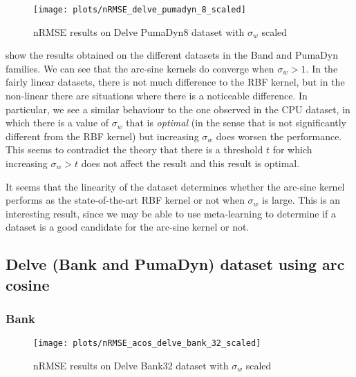 \begin{figure}[H]
    \texttt{[image: plots/nRMSE\_delve\_pumadyn\_8\_scaled]}
    \caption{nRMSE results on Delve PumaDyn8 dataset with $\sigma_w$ scaled}
    \label{fig:nrmse-delve-pumadyn-8-scaled}
\end{figure}

show the results obtained on the different datasets in the Band and PumaDyn
families. We can see that the arc-sine kernels do converge when $\sigma_w > 1$.
In the fairly linear datasets, there is not much difference to the RBF kernel,
but in the non-linear there are situations where there is a noticeable
difference. In particular, we see a similar behaviour to the one observed in the
CPU dataset, in which there is a value of $\sigma_w$ that is \emph{optimal} (in
the sense that is not significantly different from the RBF kernel) but
increasing $\sigma_w$ does worsen the performance. This seems to contradict the
theory that there is a threshold $t$ for which increasing $\sigma_w > t$ does
not affect the result and this result is optimal.

It seems that the linearity of the dataset determines whether the arc-sine
kernel performs as the state-of-the-art RBF kernel or not when $\sigma_w$ is
large. This is an interesting result, since we may be able to use meta-learning
to determine if a dataset is a good candidate for the arc-sine kernel or not.


\subsection{Delve (Bank and PumaDyn) dataset using arc cosine}


\subsubsection{Bank}

\begin{figure}[H]
    \texttt{[image: plots/nRMSE\_acos\_delve\_bank\_32\_scaled]}
    \caption{nRMSE results on Delve Bank32 dataset with $\sigma_w$ scaled}
    \label{fig:nrmse-acos-delve-bank-32-scaled}
\end{figure}

